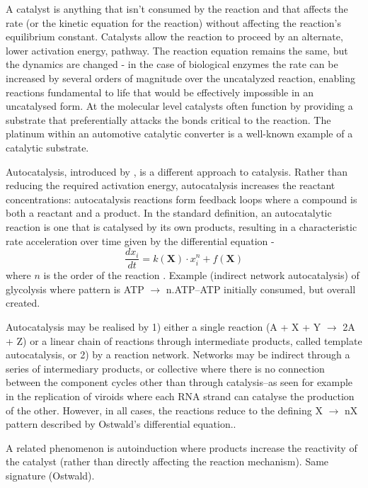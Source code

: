 A catalyst is anything that isn't consumed by the reaction and that
affects the rate (or the kinetic equation for the reaction) without
affecting the reaction's equilibrium constant. Catalysts allow the
reaction to proceed by an alternate, lower activation energy, pathway.
The reaction equation remains the same, but the dynamics are changed -
in the case of biological enzymes the rate can be increased by several
orders of magnitude over the uncatalyzed reaction, enabling reactions
fundamental to life that would be effectively impossible in an
uncatalysed form. At the molecular level catalysts often function by
providing a substrate that preferentially attacks the bonds critical to
the reaction. The platinum within an automotive catalytic converter is a
well-known example of a catalytic substrate.

Autocatalysis, introduced by \autocite{Ostwald1890}, is a different
approach to catalysis. Rather than reducing the required activation
energy, autocatalysis increases the reactant concentrations:
autocatalysis reactions form feedback loops where a compound is both a
reactant and a product. In the standard definition, an autocatalytic
reaction is one that is catalysed by its own products, resulting in a
characteristic rate acceleration over time given by the differential
equation -
\[\frac{dx_i}{dt} = k(\mathbf{X}) \cdot x^n_i + f(\mathbf{X})\] where
\(n\) is the order of the reaction \autocite{Plasson2010}. Example
(indirect network autocatalysis) of glycolysis where pattern is ATP
\(\rightarrow\) n.ATP--ATP initially consumed, but overall created.

Autocatalysis may be realised by 1) either a single reaction (\eg A + X
+ Y \(\rightarrow\) 2A + Z) or a linear chain of reactions through
intermediate products, called template autocatalysis, or 2) by a
reaction network. Networks may be indirect through a series of
intermediary products, or collective where there is no connection
between the component cycles other than through catalysis--as seen for
example in the replication of viroids where each RNA strand can catalyse
the production of the other. However, in all cases, the reactions reduce
to the defining X \(\rightarrow\) nX pattern described by Ostwald's
differential equation.\autocite{Plasson2010}.

A related phenomenon is autoinduction where products increase the
reactivity of the catalyst (rather than directly affecting the reaction
mechanism). Same signature (Ostwald).

